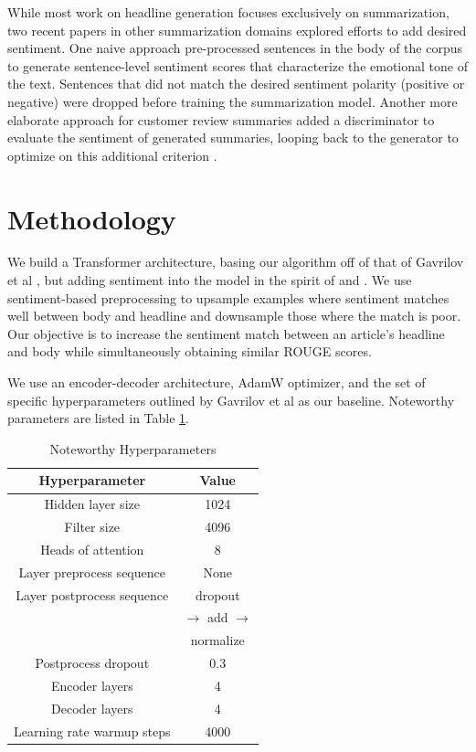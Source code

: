 \documentclass[11pt]{article}
\begin{document}
While most work on headline generation focuses exclusively on summarization, two recent papers in other summarization domains explored efforts to add desired sentiment. One naive approach pre-processed sentences in the body of the corpus to generate sentence-level sentiment scores that characterize the emotional tone of the text. Sentences that did not match the desired sentiment polarity (positive or negative) were dropped before training the summarization model\cite{DBLP:journals/corr/abs-1802-09426}. Another more elaborate approach for customer review summaries added a discriminator to evaluate the sentiment of generated summaries, looping back to the generator to optimize on this additional criterion \cite{DBLP:journals/corr/HuYLSX17}. 

\section{Methodology}
We build a Transformer architecture, basing our algorithm off of that of Gavrilov et al \cite{DBLP:journals/corr/abs-1901-07786}, but adding sentiment into the model in the spirit of \cite{DBLP:journals/corr/abs-1802-09426} and \cite{DBLP:journals/corr/HuYLSX17}. We use sentiment-based preprocessing to upsample examples where sentiment matches well between body and headline and downsample those where the match is poor. Our objective is to increase the sentiment match between an article's headline and body while simultaneously obtaining similar ROUGE scores.

We use an encoder-decoder architecture, AdamW optimizer, and the set of specific hyperparameters outlined by Gavrilov et al \cite{DBLP:journals/corr/abs-1901-07786} as our baseline. Noteworthy parameters are listed in Table \ref{table:1}.
 
\begin{table}[h!]
\centering
\begin{tabular}{|c | c|} 
 \hline
 Hyperparameter & Value \\ [0.5ex] 
 \hline
 Hidden layer size & 1024 \\ 
 Filter size & 4096 \\
 Heads of attention & 8 \\
 Layer preprocess sequence & None \\
 Layer postprocess sequence & dropout \\
 & $\rightarrow$ add $\rightarrow$ \\
 & normalize \\
 Postprocess dropout & 0.3 \\
 Encoder layers & 4 \\
 Decoder layers & 4 \\
 Learning rate warmup steps & 4000 \\ [1ex]
 \hline
\end{tabular}
\caption{Noteworthy Hyperparameters}
\label{table:1}
\end{table}
\end{document}
